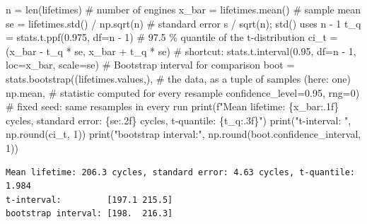 \documentclass[
  letterpaper,
  DIV=11,
  numbers=noendperiod]{scrreprt}
\newenvironment{Shaded}{\begin{snugshade}}{\end{snugshade}}
\newcommand{\BuiltInTok}[1]{\textcolor[rgb]{0.00,0.23,0.31}{#1}}
\newcommand{\CommentTok}[1]{\textcolor[rgb]{0.37,0.37,0.37}{#1}}
\newcommand{\DecValTok}[1]{\textcolor[rgb]{0.68,0.00,0.00}{#1}}
\newcommand{\FloatTok}[1]{\textcolor[rgb]{0.68,0.00,0.00}{#1}}
\newcommand{\NormalTok}[1]{\textcolor[rgb]{0.00,0.23,0.31}{#1}}
\newcommand{\OperatorTok}[1]{\textcolor[rgb]{0.37,0.37,0.37}{#1}}
\newcommand{\SpecialCharTok}[1]{\textcolor[rgb]{0.37,0.37,0.37}{#1}}
\newcommand{\SpecialStringTok}[1]{\textcolor[rgb]{0.13,0.47,0.30}{#1}}
\newcommand{\StringTok}[1]{\textcolor[rgb]{0.13,0.47,0.30}{#1}}
\begin{document}
\begin{Shaded}
\begin{Highlighting}[]
\NormalTok{n }\OperatorTok{=} \BuiltInTok{len}\NormalTok{(lifetimes)                                  }\CommentTok{\# number of engines}
\NormalTok{x\_bar }\OperatorTok{=}\NormalTok{ lifetimes.mean()                            }\CommentTok{\# sample mean}
\NormalTok{se }\OperatorTok{=}\NormalTok{ lifetimes.std() }\OperatorTok{/}\NormalTok{ np.sqrt(n)                   }\CommentTok{\# standard error s / sqrt(n); std() uses n {-} 1}
\NormalTok{t\_q }\OperatorTok{=}\NormalTok{ stats.t.ppf(}\FloatTok{0.975}\NormalTok{, df}\OperatorTok{=}\NormalTok{n }\OperatorTok{{-}} \DecValTok{1}\NormalTok{)                  }\CommentTok{\# 97.5 \% quantile of the t{-}distribution}
\NormalTok{ci\_t }\OperatorTok{=}\NormalTok{ (x\_bar }\OperatorTok{{-}}\NormalTok{ t\_q }\OperatorTok{*}\NormalTok{ se, x\_bar }\OperatorTok{+}\NormalTok{ t\_q }\OperatorTok{*}\NormalTok{ se)         }\CommentTok{\# shortcut: stats.t.interval(0.95, df=n {-} 1, loc=x\_bar, scale=se)}
\CommentTok{\# Bootstrap interval for comparison}
\NormalTok{boot }\OperatorTok{=}\NormalTok{ stats.bootstrap((lifetimes.values,),         }\CommentTok{\# the data, as a tuple of samples (here: one)}
\NormalTok{                       np.mean,                     }\CommentTok{\# statistic computed for every resample}
\NormalTok{                       confidence\_level}\OperatorTok{=}\FloatTok{0.95}\NormalTok{,}
\NormalTok{                       rng}\OperatorTok{=}\DecValTok{0}\NormalTok{)                       }\CommentTok{\# fixed seed: same resamples in every run}
\BuiltInTok{print}\NormalTok{(}\SpecialStringTok{f"Mean lifetime: }\SpecialCharTok{\{}\NormalTok{x\_bar}\SpecialCharTok{:.1f\}}\SpecialStringTok{ cycles, standard error: }\SpecialCharTok{\{}\NormalTok{se}\SpecialCharTok{:.2f\}}\SpecialStringTok{ cycles, t{-}quantile: }\SpecialCharTok{\{}\NormalTok{t\_q}\SpecialCharTok{:.3f\}}\SpecialStringTok{"}\NormalTok{)}
\BuiltInTok{print}\NormalTok{(}\StringTok{"t{-}interval:        "}\NormalTok{, np.}\BuiltInTok{round}\NormalTok{(ci\_t, }\DecValTok{1}\NormalTok{))}
\BuiltInTok{print}\NormalTok{(}\StringTok{"bootstrap interval:"}\NormalTok{, np.}\BuiltInTok{round}\NormalTok{(boot.confidence\_interval, }\DecValTok{1}\NormalTok{))}
\end{Highlighting}
\end{Shaded}

\begin{verbatim}
Mean lifetime: 206.3 cycles, standard error: 4.63 cycles, t-quantile: 1.984
t-interval:         [197.1 215.5]
bootstrap interval: [198.  216.3]
\end{verbatim}
\end{document}
